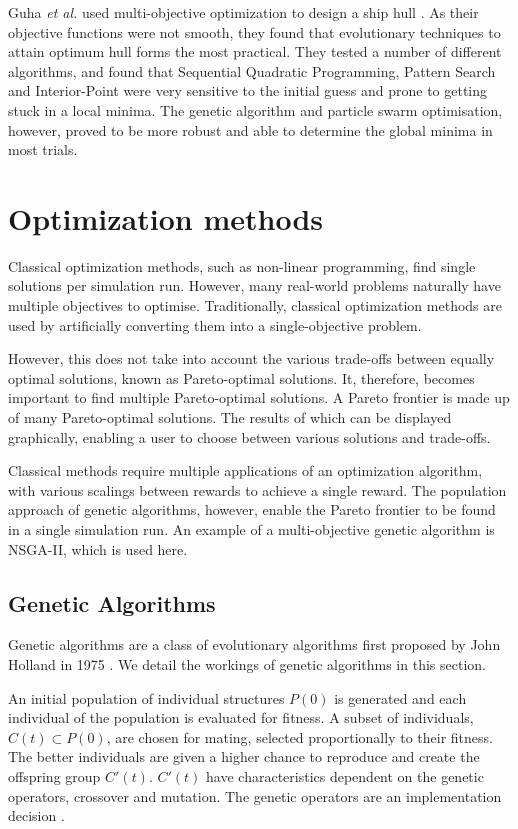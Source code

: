 \documentclass[10pt, conference, compsocconf]{IEEEtran}
\begin{document}
Guha \textit{et al.} used multi-objective optimization to design a ship hull \cite{Guha2015}. As their objective functions were not smooth, they found that evolutionary techniques to attain optimum hull forms the most practical. They tested a number of different algorithms, and found that Sequential Quadratic Programming, Pattern Search and Interior-Point were very sensitive to the initial guess and prone to getting stuck in a local minima. The genetic algorithm and particle swarm optimisation, however, proved to be more robust and able to determine the global minima in most trials.

\section{Optimization methods}
\label{method}

Classical optimization methods, such as non-linear programming, find single solutions per simulation run. However, many real-world problems naturally have multiple objectives to optimise. Traditionally, classical optimization methods are used by artificially converting them into a single-objective problem. 

However, this does not take into account the various trade-offs between equally optimal solutions, known as Pareto-optimal solutions. It, therefore, becomes important to find multiple Pareto-optimal solutions. A Pareto frontier is made up of many Pareto-optimal solutions. The results of which can be displayed graphically, enabling a user to choose between various solutions and trade-offs.

Classical methods require multiple applications of an optimization algorithm, with various scalings between rewards to achieve a single reward. The population approach of genetic algorithms, however, enable the Pareto frontier to be found in a single simulation run. An example of a multi-objective genetic algorithm is NSGA-II, which is used here.

\subsection{Genetic Algorithms}

Genetic algorithms are a class of evolutionary algorithms first proposed by John Holland in 1975 \cite{Holland1975}. We detail the workings of genetic algorithms in this section.

An initial population of individual structures $P(0)$ is generated and each individual of the population is evaluated for fitness. A subset of individuals, $C(t) \subset P(0)$, are chosen for mating, selected proportionally to their fitness. The better individuals are given a higher chance to reproduce and create the offspring group $C'(t)$. $C'(t)$ have characteristics dependent on the genetic operators, crossover and mutation. The genetic operators are an implementation decision \cite{FogelDavidB2009}. 
\end{document}
